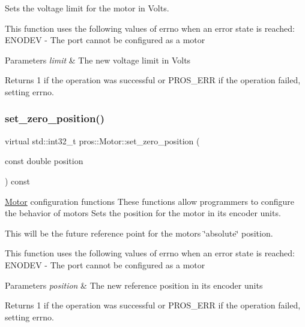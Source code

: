 Sets the voltage limit for the motor in Volts.

This function uses the following values of errno when an error state is reached\+: E\+N\+O\+D\+EV -\/ The port cannot be configured as a motor


\begin{DoxyParams}{Parameters}
{\em limit} & The new voltage limit in Volts\\
\hline
\end{DoxyParams}
\begin{DoxyReturn}{Returns}
1 if the operation was successful or P\+R\+O\+S\+\_\+\+E\+RR if the operation failed, setting errno. 
\end{DoxyReturn}
\mbox{\label{classpros_1_1Motor_af20c036c1d5d68eb5e762c12f9a4b7fe}} 
\subsubsection{\texorpdfstring{set\+\_\+zero\+\_\+position()}{set\_zero\_position()}}
{\footnotesize\ttfamily virtual std\+::int32\+\_\+t pros\+::\+Motor\+::set\+\_\+zero\+\_\+position (\begin{DoxyParamCaption}\item[{const double}]{position }\end{DoxyParamCaption}) const\hspace{0.3cm}{\ttfamily [virtual]}}

\hyperlink{classpros_1_1Motor}{Motor} configuration functions These functions allow programmers to configure the behavior of motors Sets the position for the motor in its encoder units.

This will be the future reference point for the motor\textquotesingle{}s \char`\"{}absolute\char`\"{} position.

This function uses the following values of errno when an error state is reached\+: E\+N\+O\+D\+EV -\/ The port cannot be configured as a motor


\begin{DoxyParams}{Parameters}
{\em position} & The new reference position in its encoder units\\
\hline
\end{DoxyParams}
\begin{DoxyReturn}{Returns}
1 if the operation was successful or P\+R\+O\+S\+\_\+\+E\+RR if the operation failed, setting errno. 
\end{DoxyReturn}
\mbox{\label{classpros_1_1Motor_a5d67803a65fa699a169a4ed5a107a964}} 
